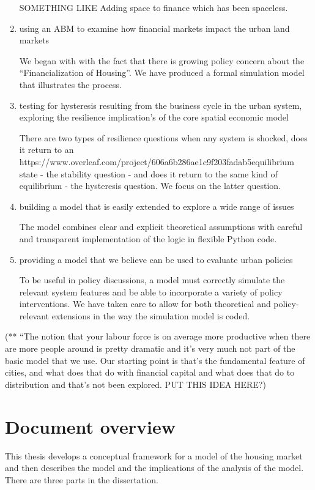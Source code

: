 \begin{enumerate}
SOMETHING LIKE Adding space to finance which has been spaceless.
    
    \item using an ABM to examine how financial markets impact the \gls{urban land markets} 

We began with with the fact that there is growing policy concern about the ``Financialization of  Housing''. We have produced a formal simulation model that illustrates the process. 

    \item testing for \gls{hysteresis} resulting from the business cycle   in the urban system, exploring the \gls{resilience} implication's of the core spatial economic model

There are two types of resilience questions when any system is shocked, does it return to an https://www.overleaf.com/project/606a6b286ae1c9f203fadab5equilibrium state - the stability question - and does it return to the same kind of equilibrium - the hysteresis question. We focus on the latter question.  

    \item building a model that is easily extended to explore a wide range of issues

The model combines clear and explicit theoretical assumptions with careful and transparent implementation of the logic in flexible Python code.

    \item providing a model that we believe can be used  to evaluate urban policies

To be useful in policy discussions, a model must correctly simulate the relevant system features and be able to incorporate a variety of policy interventions. We have taken care to allow for  both theoretical and policy- relevant extensions in the way the simulation model is coded. 
\end{enumerate}

(** ``The notion that your labour force is on average more productive when there are more people around is pretty dramatic and it's very much not part of the basic model that we use. Our starting point is that's the fundamental feature of cities, and what does that do with financial capital and what does that do to distribution and that's not been explored. PUT THIS IDEA HERE?)

\section{Document overview}
This thesis develops a conceptual framework for a model of the housing market and then describes the model and the implications of the analysis of the model. %
There are three parts in the dissertation. 


